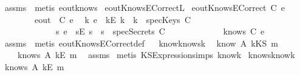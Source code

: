 \begin{isabellebody}
\isadelimproof
\endisadelimproof
\isatagproof
{}\isamarkupfalse \ assms\ \isamarkupfalse \ {\isacharparenleft}metis\ eout{\isacharunderscore}know{\isacharunderscore}s{\isacharparenright}\endisatagproof
{\isafoldproof}\isadelimproof
\isanewline
\endisadelimproof
\isanewline
{}\isamarkupfalse \ eoutKnowsECorrect{\isacharunderscore}L{}{\isacharcolon}\isanewline
{}\ {\isachardoublequoteopen}eoutKnowsECorrect\ C\ e{\isachardoublequoteclose}\ \isanewline
\ \ \ \ \ \ \ \ {\isachardoublequoteopen}eout\ \ C\ e{\isachardoublequoteclose}\isanewline
{}\ {\isachardoublequoteopen}{\isacharparenleft}{\isasymexists}\ k{\isachardot}\ e\ {\isacharequal}\ {\isacharparenleft}kE\ k{\isacharparenright}\ {\isasymand}\ {\isacharparenleft}k\ {\isasymin}\ specKeys\ C{\isacharparenright}{\isacharparenright}\ {\isasymor}\ \isanewline
\ \ \ \ \ \ \ \ \ \ \ \ {\isacharparenleft}{\isasymexists}\ s{\isachardot}\ e\ {\isacharequal}\ {\isacharparenleft}sE\ s{\isacharparenright}\ {\isasymand}\ {\isacharparenleft}s\ {\isasymin}\ specSecrets\ C{\isacharparenright}{\isacharparenright}\ {\isasymor}\isanewline
\ \ \ \ \ \ \ \ \ \ \ \ {\isacharparenleft}knows\ C\ {\isacharbrackleft}e{\isacharbrackright}{\isacharparenright}{\isachardoublequoteclose}\ \isanewline
\isadelimproof
\endisadelimproof
\isatagproof
{}\isamarkupfalse \ assms\ \isamarkupfalse \ {\isacharparenleft}metis\ eoutKnowsECorrect{\isacharunderscore}def{\isacharparenright}\endisatagproof
{\isafoldproof}\isadelimproof
\isanewline
\endisadelimproof
\ \isanewline
{}\isamarkupfalse \ know{}knows{\isacharunderscore}k{\isacharcolon}\ \isanewline
{}\ {\isachardoublequoteopen}know\ A\ {\isacharparenleft}kKS\ m{\isacharparenright}{\isachardoublequoteclose}\isanewline
{}\ \ \ \ {\isachardoublequoteopen}knows\ A\ {\isacharbrackleft}kE\ m{\isacharbrackright}{\isachardoublequoteclose}\ \isanewline
\isadelimproof
\endisadelimproof
\isatagproof
{}\isamarkupfalse \ assms\isanewline
{}\isamarkupfalse \ {\isacharparenleft}metis\ KS{}Expression{\isachardot}simps{\isacharparenleft}{}{\isacharparenright}\ know{}k{\isacharparenright}\endisatagproof
{\isafoldproof}\isadelimproof
\isanewline
\endisadelimproof
\isanewline
{}\isamarkupfalse \ knows{}know{\isacharunderscore}k{\isacharcolon}\ \isanewline
{}\ {\isachardoublequoteopen}knows\ A\ {\isacharbrackleft}kE\ m{\isacharbrackright}{\isachardoublequoteclose}\ \isanewline

\end{isabellebody}
